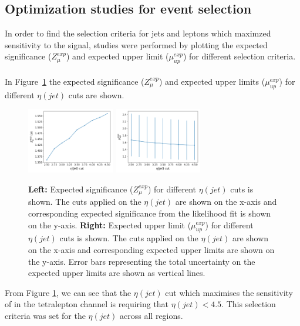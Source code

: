 \subsection{Optimization studies for event selection}

In order to find the selection criteria for jets and leptons which maximzed sensitivity to the \tWZ signal, studies were performed by plotting the expected significance ($Z_{\mu}^{exp}$) and expected upper limit ($\mu_{up}^{exp}$) for different selection criteria.\\\\

In Figure~\ref{fig:4lep-jetEta-optimisation} the expected significance ($Z_{\mu}^{exp}$) and expected upper limits ($\mu_{up}^{exp}$) for different $\eta(jet)$ cuts are shown.
\begin{figure}[h!]
	\includegraphics[width = 0.34\textwidth]{figures/signif_jetEta.png}
  	\includegraphics[width = 0.34\textwidth]{figures/exp_upper_jetEta.png}
  \centering
	\caption{\textbf{Left:} Expected significance ($Z_{\mu}^{exp}$) for different $\eta(jet)$ cuts is shown. The cuts applied on the $\eta(jet)$ are shown on the x-axis and corresponding expected significance from the likelihood fit is shown on the y-axis. \textbf{Right:} Expected upper limit ($\mu_{up}^{exp}$) for different $\eta(jet)$ cuts is shown. The cuts applied on the $\eta(jet)$ are shown on the x-axis and corresponding expected upper limits are shown on the y-axis. Error bars representing the total uncertainty on the expected upper limits are shown as vertical lines. }
	\label{fig:4lep-jetEta-optimisation}
\end{figure}


From Figure \ref{fig:4lep-jetEta-optimisation}, we can see that the $\eta(jet)$ cut which maximises the sensitivity of \tWZ in the tetralepton channel is requiring that $\eta(jet) < 4.5$. This selection criteria was set for the $\eta(jet)$ across all regions.\\\\


